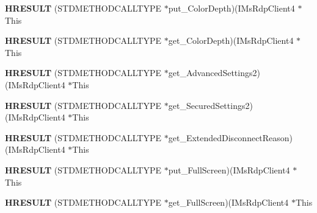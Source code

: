 \begin{DoxyCompactItemize}
\item 
\mbox{\label{struct_i_ms_rdp_client4_vtbl_ada46ae71ebdedd54fcfd27256ec56f2e}} 
{\bfseries H\+R\+E\+S\+U\+LT} (S\+T\+D\+M\+E\+T\+H\+O\+D\+C\+A\+L\+L\+T\+Y\+PE $\ast$put\+\_\+\+Color\+Depth)(I\+Ms\+Rdp\+Client4 $\ast$This
\item 
\mbox{\label{struct_i_ms_rdp_client4_vtbl_a52bf0bdc4ca73079da72dcb367b77b0d}} 
{\bfseries H\+R\+E\+S\+U\+LT} (S\+T\+D\+M\+E\+T\+H\+O\+D\+C\+A\+L\+L\+T\+Y\+PE $\ast$get\+\_\+\+Color\+Depth)(I\+Ms\+Rdp\+Client4 $\ast$This
\item 
\mbox{\label{struct_i_ms_rdp_client4_vtbl_a87d4f839f999bf9b3897c0200f4530ea}} 
{\bfseries H\+R\+E\+S\+U\+LT} (S\+T\+D\+M\+E\+T\+H\+O\+D\+C\+A\+L\+L\+T\+Y\+PE $\ast$get\+\_\+\+Advanced\+Settings2)(I\+Ms\+Rdp\+Client4 $\ast$This
\item 
\mbox{\label{struct_i_ms_rdp_client4_vtbl_adaa4d105c3f037841901c321bbb76855}} 
{\bfseries H\+R\+E\+S\+U\+LT} (S\+T\+D\+M\+E\+T\+H\+O\+D\+C\+A\+L\+L\+T\+Y\+PE $\ast$get\+\_\+\+Secured\+Settings2)(I\+Ms\+Rdp\+Client4 $\ast$This
\item 
\mbox{\label{struct_i_ms_rdp_client4_vtbl_a8794e33049f679663c45e2d2507c368c}} 
{\bfseries H\+R\+E\+S\+U\+LT} (S\+T\+D\+M\+E\+T\+H\+O\+D\+C\+A\+L\+L\+T\+Y\+PE $\ast$get\+\_\+\+Extended\+Disconnect\+Reason)(I\+Ms\+Rdp\+Client4 $\ast$This
\item 
\mbox{\label{struct_i_ms_rdp_client4_vtbl_a354b753ba5a3834fe08c2049058ab8dd}} 
{\bfseries H\+R\+E\+S\+U\+LT} (S\+T\+D\+M\+E\+T\+H\+O\+D\+C\+A\+L\+L\+T\+Y\+PE $\ast$put\+\_\+\+Full\+Screen)(I\+Ms\+Rdp\+Client4 $\ast$This
\item 
\mbox{\label{struct_i_ms_rdp_client4_vtbl_a0fcd5bf8851340870242d2de5841b1d7}} 
{\bfseries H\+R\+E\+S\+U\+LT} (S\+T\+D\+M\+E\+T\+H\+O\+D\+C\+A\+L\+L\+T\+Y\+PE $\ast$get\+\_\+\+Full\+Screen)(I\+Ms\+Rdp\+Client4 $\ast$This
\item 
\mbox{\label{struct_i_ms_rdp_client4_vtbl_a2e93d706f4b412911e9535ecd36b4bb9}} 

\end{DoxyCompactItemize}
